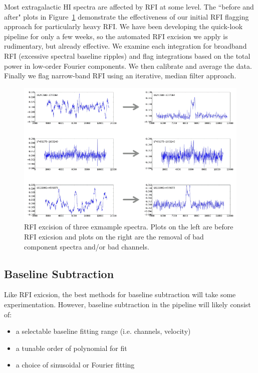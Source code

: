 Most extragalactic HI spectra are affected by RFI at some level.  The ``before and after" plots in Figure~\ref{fig:RFIfigure} demonstrate the effectiveness of our initial RFI flagging approach for particularly heavy RFI.  We have been developing the quick-look pipeline for only a few weeks, so the automated RFI excision we apply is rudimentary, but already effective. We examine each integration for broadband RFI (excessive spectral baseline ripples) and flag integrations based on the total power in low-order Fourier components. We then calibrate and average the data. Finally we flag narrow-band RFI using an iterative, median filter approach.

\begin{figure}[ht!]
\centering%
\includegraphics[width=5in]{part7/Masters_P66/P66_f1}
\caption{RFI excision of three exmample spectra.  Plots on the left are before RFI exicsion and plots on the right are the removal of bad component spectra and/or bad channels.}
\label{fig:RFIfigure}
\end{figure}

\subsection{Baseline Subtraction}

Like RFI exicsion, the best methods for baseline subtraction will take some experimentation.  However, baseline subtraction in the pipeline will likely consist of:

\begin{itemize}
\item a selectable baseline fitting range (i.e. channels, velocity)
\item a tunable order of polynomial for fit
\item a choice of sinusoidal or Fourier fitting
\end{itemize}

